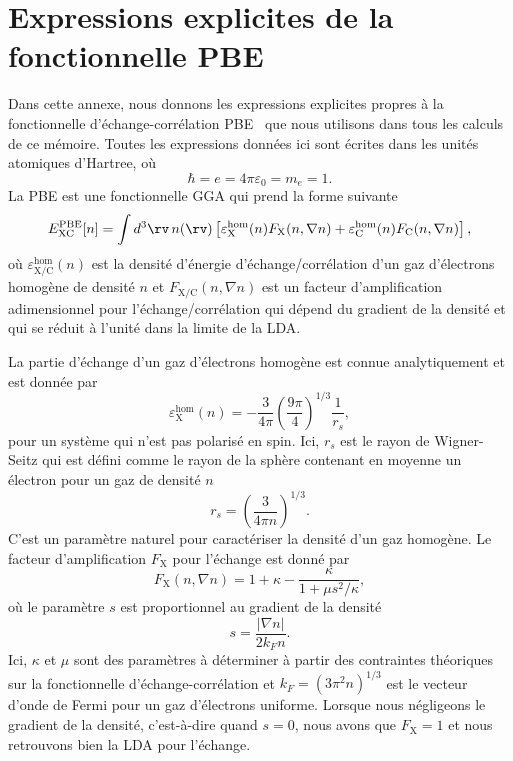 \chapter{Expressions explicites de la fonctionnelle PBE}\label{annexe:pbe}

Dans cette annexe, nous donnons les expressions explicites propres à la fonctionnelle d'échange-corrélation PBE~\cite{perdewGeneralizedGradientApproximation1996a} que nous utilisons dans tous les calculs de ce mémoire. Toutes les expressions données ici sont écrites dans les unités atomiques d'Hartree, où
\begin{equation}
    \hbar = e = 4\pi\varepsilon_0 = m_e = 1.
    \label{eqn:a1_unités_hartree}
\end{equation}
La PBE est une fonctionnelle GGA qui prend la forme suivante
\begin{equation}
    E_\text{XC}^\text{PBE}[n]=\int d^3\rv\,n(\rv)\left[\varepsilon_\text{X}^\text{hom}(n)F_\text{X}(n,\nabla n)+\varepsilon_\text{C}^\text{hom}(n)F_\text{C}(n,\nabla n)\right],
    \label{eqn:a1_EPBE}
\end{equation}
où $\varepsilon_\text{X/C}^\text{hom}(n)$ est la densité d'énergie d'échange/corrélation d'un gaz d'électrons homogène de densité $n$ et $F_\text{X/C}(n,\nabla n)$ est un facteur d'amplification adimensionnel pour l'échange/corrélation qui dépend du gradient de la densité et qui se réduit à l'unité dans la limite de la LDA.

La partie d'échange d'un gaz d'électrons homogène est connue analytiquement et est donnée par~\cite{martinElectronicStructureBasic2004}
\begin{equation}
    \varepsilon_\text{X}^\text{hom}(n)=-\frac{3}{4\pi}\left(\frac{9\pi}{4}\right)^{1/3}\frac{1}{r_s},
    \label{eqn:a1_eX}
\end{equation}
pour un système qui n'est pas polarisé en spin. Ici, $r_s$ est le rayon de Wigner-Seitz qui est défini comme le rayon de la sphère contenant en moyenne un électron pour un gaz de densité $n$
\begin{equation}
    r_s = \left(\frac{3}{4\pi n}\right)^{1/3}.
    \label{eqn:a1_rs}
\end{equation}
C'est un paramètre naturel pour caractériser la densité d'un gaz homogène. Le facteur d'amplification $F_\text{X}$ pour l'échange est donné par
\begin{equation} 
    F_\text{X}(n,\nabla n)=1+\kappa-\frac{\kappa}{1+\mu s^2/\kappa},
    \label{eqn:a1_FX}
\end{equation}
où le paramètre $s$ est proportionnel au gradient de la densité
\begin{equation}
    s=\frac{|\nabla n|}{2k_Fn}.
\end{equation}
Ici, $\kappa$ et $\mu$ sont des paramètres à déterminer à partir des contraintes théoriques sur la fonctionnelle d'échange-corrélation et $k_F=(3\pi^2n)^{1/3}$ est le vecteur d'onde de Fermi pour un gaz d'électrons uniforme. Lorsque nous négligeons le gradient de la densité, c'est-à-dire quand $s=0$, nous avons que $F_\text{X}=1$ et nous retrouvons bien la LDA pour l'échange. 

